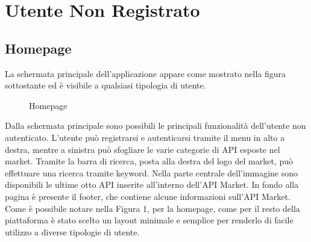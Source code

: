 \newpage
\section{Utente Non Registrato}

	\subsection{Homepage}
		La schermata principale dell'applicazione appare come mostrato nella figura sottostante ed è visibile a qualsiasi tipologia di utente.
		
		\label{Homepage}
		\begin{figure}[H]
			\centering
			\caption{Homepage}
		\end{figure}
		
		Dalla schermata principale sono possibili le principali funzionalità dell'utente non autenticato. L'utente può registrarsi e autenticarsi tramite il menu in alto a destra, mentre a sinistra può sfogliare le varie categorie di API esposte nel market. Tramite la barra di ricerca, posta alla destra del logo del market, può effettuare una ricerca tramite keyword. Nella parte centrale dell'immagine sono disponibili le ultime otto API inserite all'interno dell'API Market.
		In fondo alla pagina è presente il footer, che contiene alcune informazioni sull'API Market.
		Come è possibile notare nella Figura 1, per la homepage, come per il resto della piattaforma è stato scelto un layout minimale e semplice per renderlo di facile utilizzo a diverse tipologie di utente.

